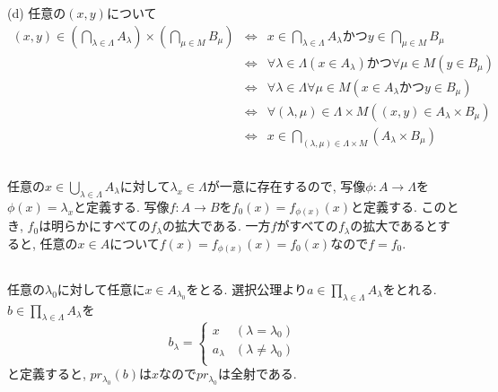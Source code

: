 \documentclass{jsarticle}
\begin{document}
(d) 任意の$(x, y)$について
\begin{eqnarray*}
	(x, y) \in \left(\bigcap_{\lambda \in \Lambda}A_\lambda\right) \times \left(\bigcap_{\mu \in M}B_\mu\right)
	&\Leftrightarrow& x \in \bigcap_{\lambda \in \Lambda}A_\lambda かつ y \in \bigcap_{\mu \in M}B_\mu\\
	&\Leftrightarrow& \forall{\lambda \in \Lambda}(x \in A_\lambda) かつ \forall{\mu \in M}(y \in B_\mu)\\
	&\Leftrightarrow& \forall{\lambda \in \Lambda}\forall{\mu \in M}(x \in A_\lambda かつ y \in B_\mu)\\
	&\Leftrightarrow& \forall{(\lambda, \mu) \in \Lambda \times M}((x, y) \in A_\lambda \times B_\mu)\\
	&\Leftrightarrow& x \in \bigcap_{(\lambda, \mu) \in \Lambda \times M}(A_\lambda \times B_\mu)
\end{eqnarray*}

\subsection{} %
任意の$x \in \bigcup_{\lambda \in \Lambda}A_\lambda$に対して$\lambda_x \in \Lambda$が一意に存在するので, 写像$\phi:A \rightarrow \Lambda$を$\phi(x) = \lambda_x$と定義する. 写像$f:A \rightarrow B$を$f_0(x) = f_{\phi(x)}(x)$と定義する. このとき, $f_0$は明らかにすべての$f_\lambda$の拡大である. 一方$f$がすべての$f_\lambda$の拡大であるとすると, 任意の$x \in A$について$f(x) = f_{\phi(x)}(x) = f_0(x)$なので$f = f_0$.

\subsection{} %
任意の$\lambda_0$に対して任意に$x \in A_{\lambda_0}$をとる. 選択公理より$a \in \prod_{\lambda \in \Lambda}A_\lambda$をとれる. $b \in \prod_{\lambda \in \Lambda}A_\lambda$を
\begin{equation*}
	b_\lambda = 
	\begin{cases}
		x & (\lambda = \lambda_0)\\
		a_\lambda & (\lambda \neq \lambda_0)\\
	\end{cases}
\end{equation*}
と定義すると, $pr_{\lambda_0}(b)$は$x$なので$pr_{\lambda_0}$は全射である.
\end{document}
